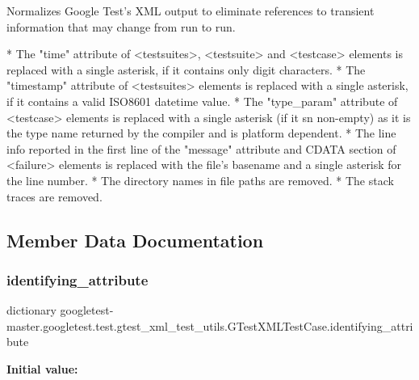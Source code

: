 \begin{DoxyVerb}Normalizes Google Test's XML output to eliminate references to transient
information that may change from run to run.

*  The "time" attribute of <testsuites>, <testsuite> and <testcase>
   elements is replaced with a single asterisk, if it contains
   only digit characters.
*  The "timestamp" attribute of <testsuites> elements is replaced with a
   single asterisk, if it contains a valid ISO8601 datetime value.
*  The "type_param" attribute of <testcase> elements is replaced with a
   single asterisk (if it sn non-empty) as it is the type name returned
   by the compiler and is platform dependent.
*  The line info reported in the first line of the "message"
   attribute and CDATA section of <failure> elements is replaced with the
   file's basename and a single asterisk for the line number.
*  The directory names in file paths are removed.
*  The stack traces are removed.
\end{DoxyVerb}
 

\subsection{Member Data Documentation}
\mbox{\label{classgoogletest-master_1_1googletest_1_1test_1_1gtest__xml__test__utils_1_1_g_test_x_m_l_test_case_a819d2d5213bad859c7fc9600d561b708}} 
\subsubsection{\texorpdfstring{identifying\_attribute}{identifying\_attribute}}
{\footnotesize\ttfamily dictionary googletest-\/master.\+googletest.\+test.\+gtest\+\_\+xml\+\_\+test\+\_\+utils.\+G\+Test\+X\+M\+L\+Test\+Case.\+identifying\+\_\+attribute\hspace{0.3cm}{\ttfamily [static]}}

{\bfseries Initial value\+:}
\begin{DoxyCode}{0}
\DoxyCodeLine{=  \{}
\DoxyCodeLine{      \textcolor{stringliteral}{'testsuites'}: \textcolor{stringliteral}{'name'},}
\DoxyCodeLine{      \textcolor{stringliteral}{'testsuite'}: \textcolor{stringliteral}{'name'},}
\DoxyCodeLine{      \textcolor{stringliteral}{'testcase'}: \textcolor{stringliteral}{'name'},}
\DoxyCodeLine{      \textcolor{stringliteral}{'failure'}: \textcolor{stringliteral}{'message'},}
\DoxyCodeLine{      \textcolor{stringliteral}{'property'}: \textcolor{stringliteral}{'name'},}
\DoxyCodeLine{  \}}

\end{DoxyCode}


